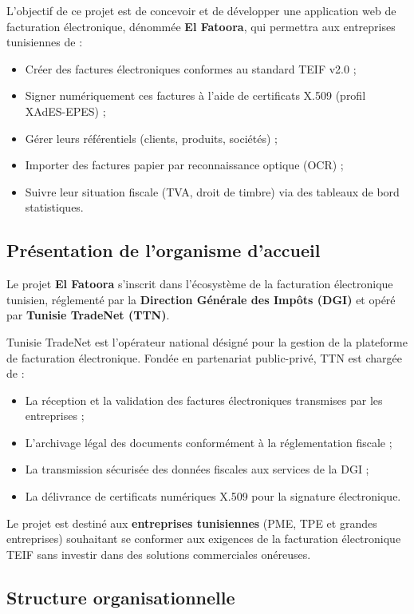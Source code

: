 \documentclass[a4paper,12pt]{report}
\newcommand{\elfattoora}{\textbf{El Fatoora}}
\begin{document}
L'objectif de ce projet est de concevoir et de développer une application web de facturation électronique, dénommée \elfattoora{}, qui permettra aux entreprises tunisiennes de :
\begin{itemize}[nosep]
    \item Créer des factures électroniques conformes au standard TEIF v2.0 ;
    \item Signer numériquement ces factures à l'aide de certificats X.509 (profil XAdES-EPES) ;
    \item Gérer leurs référentiels (clients, produits, sociétés) ;
    \item Importer des factures papier par reconnaissance optique (OCR) ;
    \item Suivre leur situation fiscale (TVA, droit de timbre) via des tableaux de bord statistiques.
\end{itemize}

\subsection{Présentation de l'organisme d'accueil}

Le projet \elfattoora{} s'inscrit dans l'écosystème de la facturation électronique tunisien, réglementé par la \textbf{Direction Générale des Impôts (DGI)} et opéré par \textbf{Tunisie TradeNet (TTN)}.

Tunisie TradeNet est l'opérateur national désigné pour la gestion de la plateforme de facturation électronique. Fondée en partenariat public-privé, TTN est chargée de :
\begin{itemize}[nosep]
    \item La réception et la validation des factures électroniques transmises par les entreprises ;
    \item L'archivage légal des documents conformément à la réglementation fiscale ;
    \item La transmission sécurisée des données fiscales aux services de la DGI ;
    \item La délivrance de certificats numériques X.509 pour la signature électronique.
\end{itemize}

Le projet est destiné aux \textbf{entreprises tunisiennes} (PME, TPE et grandes entreprises) souhaitant se conformer aux exigences de la facturation électronique TEIF sans investir dans des solutions commerciales onéreuses.

\subsection{Structure organisationnelle}
\end{document}
